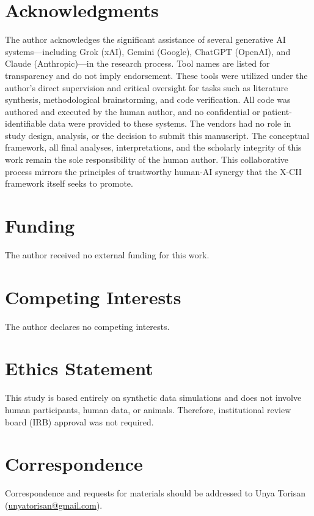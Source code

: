 \documentclass[11pt,a4paper]{article}
\begin{document}
\section*{Acknowledgments}
The author acknowledges the significant assistance of several generative AI systems---including Grok (xAI), Gemini (Google), ChatGPT (OpenAI), and Claude (Anthropic)---in the research process. Tool names are listed for transparency and do not imply endorsement. These tools were utilized under the author's direct supervision and critical oversight for tasks such as literature synthesis, methodological brainstorming, and code verification. All code was authored and executed by the human author, and no confidential or patient-identifiable data were provided to these systems. The vendors had no role in study design, analysis, or the decision to submit this manuscript. The conceptual framework, all final analyses, interpretations, and the scholarly integrity of this work remain the sole responsibility of the human author. This collaborative process mirrors the principles of trustworthy human-AI synergy that the X-CII framework itself seeks to promote.
\section*{Funding}
The author received no external funding for this work.
\section*{Competing Interests}
The author declares no competing interests.
\section*{Ethics Statement}
This study is based entirely on synthetic data simulations and does not involve human participants, human data, or animals. Therefore, institutional review board (IRB) approval was not required.
\section*{Correspondence}
Correspondence and requests for materials should be addressed to Unya Torisan (\href{mailto:unyatorisan@gmail.com}{unyatorisan@gmail.com}).
\appendix
\end{document}
